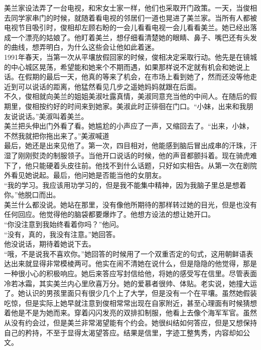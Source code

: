 \begin{multicols}{\theparacolNo}
美兰家设法弄了一台电视，和宋女士家一样，他们也采取开门政策。一天，当俊相去同学家串门的时候，就随着看电视的邻居们一道也晃进了美兰家。当所有人都被电视节目吸引时，俊相却左顾右盼的一会儿看看电视一会儿看看美兰。她已经出落成一个漂亮的姑娘了。他盯着美兰，想仔细看清楚她的眼睛、鼻子、嘴巴还有头发的曲线，想弄明白，为什么这些会让他如此着迷。\\

1991年春天，当第一次从平壤放假回家的时候，俊相决定采取行动。他先是在镜城的中心城区晃荡，希望能和她来个不期而遇，如果那样说不定就有机会和她说上话。在假期的最后一天，他真的等来了机会，在市场上看到她了，然而还没等他走近到可以说话的距离，他猛然看见几步之遥她妈妈就跟在后面。\\

不久，俊相就向美兰的姐姐美淑吐露真情，美淑同意充当他的中间人。在随后的假期里，俊相按约好的时间来到她家。美淑此时正徘徊在门口。“小妹，出来和我朋友说说话。”美淑叫着美兰。\\

美兰把头伸出门外看了看。她尴尬的小声应了一声，又缩回去了。“出来，小妹，不然我就把你拖出来了。”美淑喊道\\

最后，她还是出来见他了。第一次，四目相对，他能感到脑后冒出成串的汗珠，汗湿了刚刚熨烫的制服领子。当他开口说话的时候，他的声音都颤抖着。现在骑虎难下了，他只能硬着头皮往前。他找不到什么话题，只好如实相告。从第一次在剧院外看见她说起。最后，他问她是否能当他的女朋友。\\

“我的学习。我应该用功学习的，但是我不能集中精神，因为我脑子里总是想着你。”他脱口而出。\\

美兰什么都没说。她站在那里，没有像他所期待的那样转过她的目光，但是也没有任何回应。他觉得他的脑袋都要爆炸了。他想方设法的想让她开口。\\

“你没注意到我始终看着你吗？”他问。\\

“没有，真的，我没有注意。”她回答。\\

他没说话，期待着她说下去。\\

“哦，不是说我不喜欢你。”她回答的时候用了一个双重否定的句式，这用朝鲜语表达出来就显得非常模棱两可。他实在闹不清她在说什么，但是隐隐的他觉得，那是一种很小心的积极响应。她后来答应写封信给他，将她的感受写在信里。尽管表面冷若冰霜，其实美兰内心里欣喜万分。她的爱慕者很帅、体贴。老实说，她撞大运了。她认识的男孩里面只有很少几个上了大学，但是没有一个在平壤。虽然她假装吃惊，但是实际上她早就注意到俊相常常出现在自家附近，甚至心理面有时候猜想着他是不是为她而来。穿着闪闪发亮的双排扣制服，他看上去像个海军军官。虽然从没有约会过，但是美兰非常渴望能有个约会。她很纠结如何答应，但是又想保持自己的矜持，不至于显得太渴望答应。结果是信里，字迹工整隽秀，内容却如公文。\\


\end{multicols}
